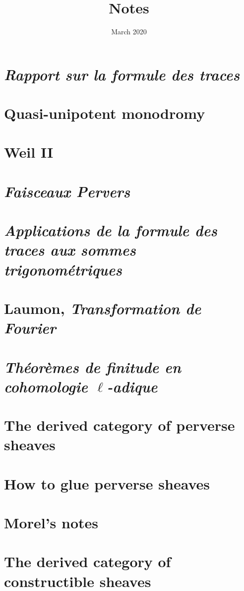 \documentclass[12pt, fleqn, oneside, reqno]{amsbook}
\title{Notes}
\date{March 2020}
\theoremstyle{bfth}
\theoremstyle{bfthstar}
\theoremstyle{definition}
\theoremstyle{remark}
\begin{document}
\maketitle
{\setlength{\parskip}{0.5em}\small\tableofcontents\par}

\section{\emph{Rapport sur la formule des traces}}


\newpage
\setcounter{section}{1}
\section{Quasi-unipotent monodromy}


\newpage
\setcounter{section}{2}
\section{Weil II}


\newpage
\section{\emph{Faisceaux Pervers}}


\newpage
\section{\emph{Applications de la formule des traces aux sommes trigonométriques}}\label{sec:sommes_trig}


\newpage
\section{Laumon, \emph{Transformation de Fourier}}
\label{sec:laumon}


\newpage
\section{\emph{Théorèmes de finitude en
cohomologie $\ell$-adique}}\label{sec:thfin}


\newpage
\section{The derived category of perverse sheaves}


\newpage
\section{How to glue perverse sheaves}


\newpage
\section{Morel's notes}\label{morel}


\newpage
\section{The derived category of constructible sheaves}\label{derived_p}

\end{document}
